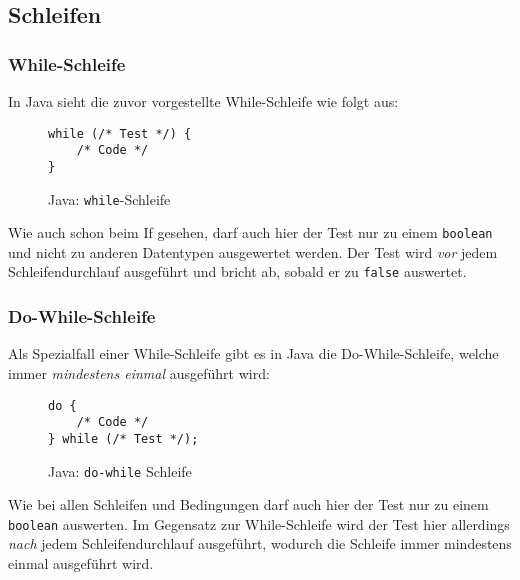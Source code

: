 \subsection{Schleifen}
	
	\subsubsection{While-Schleife}
		In Java sieht die zuvor vorgestellte While-Schleife wie folgt aus:
		\begin{figure}[H]
			\centering
			\begin{lstlisting}
while (/* Test */) {
	/* Code */
}
			\end{lstlisting}
			\caption{Java: \texttt{while}-Schleife}
		\end{figure}
		
		Wie auch schon beim If gesehen, darf auch hier der Test nur zu einem \texttt{boolean} und nicht zu anderen Datentypen ausgewertet werden. Der Test wird \textit{vor} jedem Schleifendurchlauf ausgeführt und bricht ab, sobald er zu \texttt{false} auswertet.
	
	\subsubsection{Do-While-Schleife}
		Als Spezialfall einer While-Schleife gibt es in Java die Do-While-Schleife, welche immer \textit{mindestens einmal} ausgeführt wird:
		\begin{figure}[H]
			\centering
			\begin{lstlisting}
do {
	/* Code */
} while (/* Test */);
			\end{lstlisting}
			\caption{Java: \texttt{do-while} Schleife}
		\end{figure}
		
		Wie bei allen Schleifen und Bedingungen darf auch hier der Test nur zu einem \texttt{boolean} auswerten. Im Gegensatz zur While-Schleife wird der Test hier allerdings \textit{nach} jedem Schleifendurchlauf ausgeführt, wodurch die Schleife immer mindestens einmal ausgeführt wird.
	
